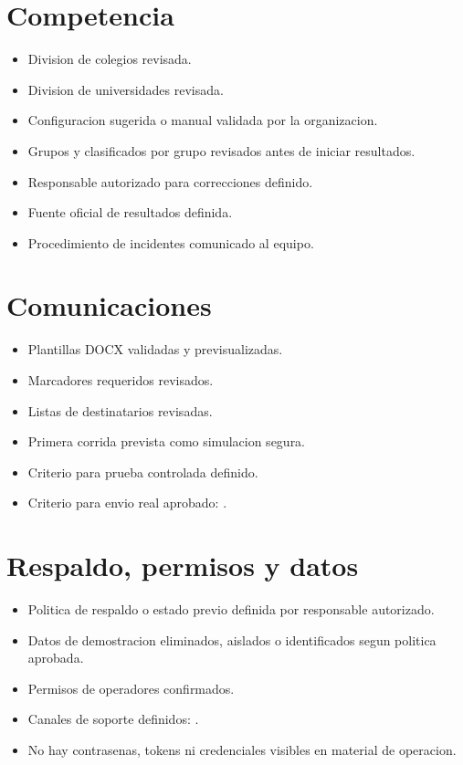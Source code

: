 \section*{Competencia}
\begin{itemize}
    \item[\casilla] Division de colegios revisada.
    \item[\casilla] Division de universidades revisada.
    \item[\casilla] Configuracion sugerida o manual validada por la organizacion.
    \item[\casilla] Grupos y clasificados por grupo revisados antes de iniciar resultados.
    \item[\casilla] Responsable autorizado para correcciones definido.
    \item[\casilla] Fuente oficial de resultados definida.
    \item[\casilla] Procedimiento de incidentes comunicado al equipo.
\end{itemize}

\section*{Comunicaciones}
\begin{itemize}
    \item[\casilla] Plantillas DOCX validadas y previsualizadas.
    \item[\casilla] Marcadores requeridos revisados.
    \item[\casilla] Listas de destinatarios revisadas.
    \item[\casilla] Primera corrida prevista como simulacion segura.
    \item[\casilla] Criterio para prueba controlada definido.
    \item[\casilla] Criterio para envio real aprobado: .
\end{itemize}

\section*{Respaldo, permisos y datos}
\begin{itemize}
    \item[\casilla] Politica de respaldo o estado previo definida por responsable autorizado.
    \item[\casilla] Datos de demostracion eliminados, aislados o identificados segun politica aprobada.
    \item[\casilla] Permisos de operadores confirmados.
    \item[\casilla] Canales de soporte definidos: .
    \item[\casilla] No hay contrasenas, tokens ni credenciales visibles en material de operacion.
\end{itemize}
